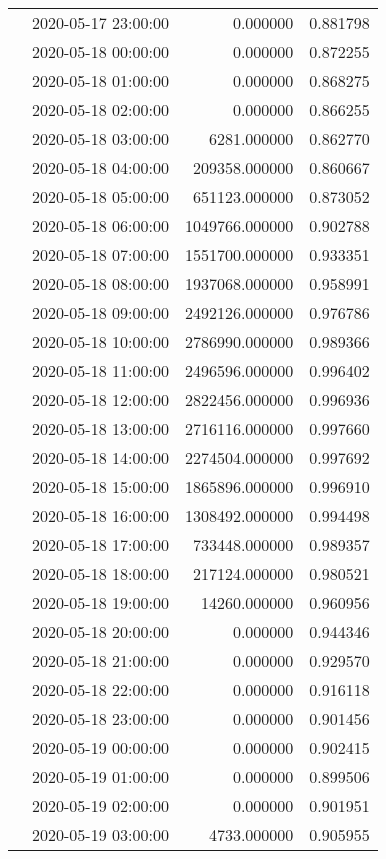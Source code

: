 \begin{tabular}{llrr}
 & 2020-05-17 23:00:00 & 0.000000 & 0.881798 \\
 & 2020-05-18 00:00:00 & 0.000000 & 0.872255 \\
 & 2020-05-18 01:00:00 & 0.000000 & 0.868275 \\
 & 2020-05-18 02:00:00 & 0.000000 & 0.866255 \\
 & 2020-05-18 03:00:00 & 6281.000000 & 0.862770 \\
 & 2020-05-18 04:00:00 & 209358.000000 & 0.860667 \\
 & 2020-05-18 05:00:00 & 651123.000000 & 0.873052 \\
 & 2020-05-18 06:00:00 & 1049766.000000 & 0.902788 \\
 & 2020-05-18 07:00:00 & 1551700.000000 & 0.933351 \\
 & 2020-05-18 08:00:00 & 1937068.000000 & 0.958991 \\
 & 2020-05-18 09:00:00 & 2492126.000000 & 0.976786 \\
 & 2020-05-18 10:00:00 & 2786990.000000 & 0.989366 \\
 & 2020-05-18 11:00:00 & 2496596.000000 & 0.996402 \\
 & 2020-05-18 12:00:00 & 2822456.000000 & 0.996936 \\
 & 2020-05-18 13:00:00 & 2716116.000000 & 0.997660 \\
 & 2020-05-18 14:00:00 & 2274504.000000 & 0.997692 \\
 & 2020-05-18 15:00:00 & 1865896.000000 & 0.996910 \\
 & 2020-05-18 16:00:00 & 1308492.000000 & 0.994498 \\
 & 2020-05-18 17:00:00 & 733448.000000 & 0.989357 \\
 & 2020-05-18 18:00:00 & 217124.000000 & 0.980521 \\
 & 2020-05-18 19:00:00 & 14260.000000 & 0.960956 \\
 & 2020-05-18 20:00:00 & 0.000000 & 0.944346 \\
 & 2020-05-18 21:00:00 & 0.000000 & 0.929570 \\
 & 2020-05-18 22:00:00 & 0.000000 & 0.916118 \\
 & 2020-05-18 23:00:00 & 0.000000 & 0.901456 \\
 & 2020-05-19 00:00:00 & 0.000000 & 0.902415 \\
 & 2020-05-19 01:00:00 & 0.000000 & 0.899506 \\
 & 2020-05-19 02:00:00 & 0.000000 & 0.901951 \\
 & 2020-05-19 03:00:00 & 4733.000000 & 0.905955 \\

\end{tabular}
